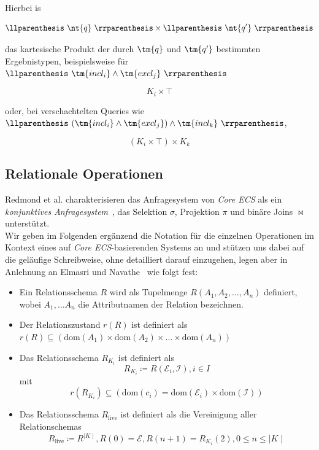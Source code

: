 \bigskip
\noindent
Hierbei is

\[
    \llparenthesis\  \nt{q} \ \rrparenthesis  \times \llparenthesis\  \nt{q'} \ \rrparenthesis 
\]

\noindent
das kartesische Produkt der durch $\tm{q}$ und $\tm{q'}$ bestimmten Ergebnistypen, beispielsweise für $\llparenthesis \ \tm{incl_i} \land \tm{excl_j} \ \rrparenthesis$

\[
    K_i \times \top
\]

\noindent
oder, bei verschachtelten Queries wie  $\llparenthesis \ (\tm{incl_i} \land \tm{excl_j}) \land \tm{incl_k} \ \rrparenthesis $,


\[
     (K_i \times \top) \times  K_k
\]

\subsection*{Relationale Operationen}

Redmond et {al.} charakterisieren das Anfragesystem von \textit{Core ECS} als ein \textit{konjunktives Anfragesystem}~\cite[S.37--63]{AHV95},
das Selektion $\sigma$, Projektion $\pi$ und binäre Joins $\bowtie$ unterstützt.\\

\noindent
Wir geben im Folgenden ergänzend die Notation für die einzelnen Operationen im Kontext eines auf \textit{Core ECS}-basierenden Systems an und stützen uns dabei auf die geläufige Schreibweise, ohne detailliert darauf einzugehen, legen aber in Anlehnung an Elmasri und Navathe~\cite[S. 137--140]{EN11} wie folgt fest:

\begin{itemize}
    \item Ein Relationsschema $R$ wird als Tupelmenge $R(A_1, A_2, \ldots, A_n)$ definiert, wobei $A_1, \ldots A_n$ die Attributnamen der Relation bezeichnen.
    \item Der Relationszustand $r(R)$ ist definiert als $r(R) \subseteq (\text{dom}(A_1) \times \text{dom}(A_2) \times \ldots \times \text{dom}(A_n))$
    \item Das Relationsschema $R_{K_i}$ ist definiert als
    \[
         R_{K_i} \coloneqq R(\mathcal{E}_i, \mathcal{I}), i \in I
    \]
    mit
    \[
        r(R_{K_i}) \subseteq (\text{dom}(c_i) = \text{dom}(\mathcal{E}_i) \times \text{dom}(\mathcal{I}))
    \]
    \item Das Relationsschema $R_\text{live}$ ist definiert als die Vereinigung aller Relationschemas
    \[
        R_\text{live} \coloneqq R^{\mid K \mid}, R(0) = \mathcal{E}, R(n + 1) = R_{K_i}(2), 0 \leq n \leq \mid K \mid
    \]
\end{itemize}

